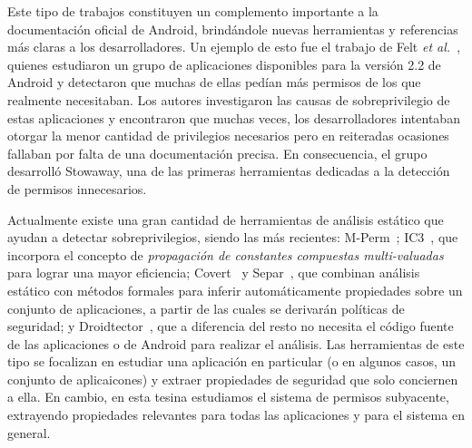 Este tipo de trabajos constituyen un complemento importante a la documentación
oficial de Android, brindándole nuevas herramientas y referencias más claras a
%
%
los desarrolladores. Un ejemplo de esto fue el trabajo de Felt \textit{et
al.}~\cite{felt}, quienes estudiaron un grupo de aplicaciones disponibles para
la versión 2.2 de Android y detectaron que muchas de ellas pedían más permisos
de los que realmente necesitaban. Los autores investigaron las causas de
sobreprivilegio de estas aplicaciones y encontraron que muchas veces, los
desarrolladores intentaban otorgar la menor cantidad de privilegios necesarios
pero en reiteradas ocasiones fallaban por falta de una documentación precisa. En
consecuencia, el grupo desarrolló Stowaway, una de las primeras herramientas
dedicadas a la detección de permisos innecesarios.

Actualmente existe una gran cantidad de herramientas de análisis estático que
ayudan a detectar sobreprivilegios, siendo las más recientes:
M-Perm~\cite{mperm}; IC3~\cite{ic3}, que incorpora el concepto de
\textit{propagación de constantes compuestas multi-valuadas} para lograr una
mayor eficiencia; Covert~\cite{covert} y Separ~\cite{separ}, que combinan
análisis estático con métodos formales para inferir automáticamente propiedades
sobre un conjunto de aplicaciones, a partir de las cuales se derivarán políticas
de seguridad; y Droidtector~\cite{droidtector}, que a diferencia del resto no
necesita el código fuente de las aplicaciones o de Android para realizar el análisis. Las herramientas de
este tipo se focalizan en estudiar una aplicación en particular (o en algunos
casos, un conjunto de aplicaicones) y extraer propiedades de seguridad que solo
conciernen a ella. En cambio, en esta tesina estudiamos el sistema de permisos
subyacente, extrayendo propiedades relevantes para todas las aplicaciones y para
el sistema en general.


